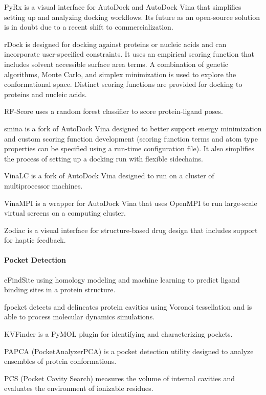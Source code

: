 PyRx \cite{Dallakyan_2014} is a visual interface for AutoDock and AutoDock Vina that simplifies setting up and analyzing docking workflows.  Its future as an open-source solution is in doubt due to a recent shift to commercialization.

rDock \cite{Ruiz_Carmona_2014}  is designed for docking against proteins or nucleic acids and can incorporate user-specified constraints. It uses an empirical scoring function that includes solvent accessible surface area terms. A combination of genetic algorithms, Monte Carlo, and simplex minimization is used to explore the conformational space. Distinct scoring functions are provided for docking to proteins and nucleic acids.

RF-Score \cite{Li_2015,Ballester_2010} uses a random forest classifier to score protein-ligand poses.

smina \cite{Koes_2013} is a fork of AutoDock Vina designed to better support energy minimization and custom scoring function development (scoring function terms and atom type properties can be specified using a run-time configuration file). It also simplifies the process of setting up a docking run with flexible sidechains.

VinaLC  \cite{Zhang_2013} is a fork of AutoDock Vina designed to run on a cluster of multiprocessor machines.

VinaMPI \cite{Ellingson_2013} is a wrapper for AutoDock Vina that uses OpenMPI to run large-scale virtual screens on a computing cluster.

Zodiac \cite{Zonta_2008} is a visual interface for structure-based drug design that includes support for haptic feedback.

\paragraph{Pocket Detection}
eFindSite \cite{Brylinski_2013} using homology modeling and machine learning to predict ligand binding sites in a protein structure.

fpocket  \cite{Schmidtke_2011} detects and delineates protein cavities using Voronoi tessellation and is able to process molecular dynamics simulations.

KVFinder \cite{Oliveira_2014} is a PyMOL plugin for identifying and characterizing pockets.

PAPCA (PocketAnalyzerPCA) is a pocket detection utility designed to analyze ensembles of protein conformations.

PCS (Pocket Cavity Search) measures the volume of internal cavities and evaluates the environment of ionizable residues.

